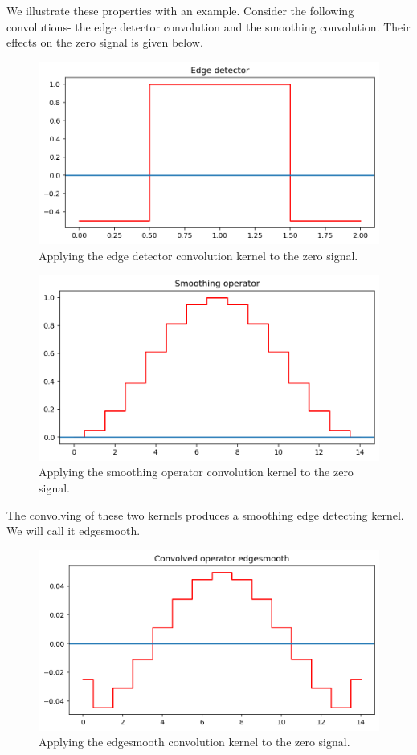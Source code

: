 \documentclass[a4paper, openany]{memoir}
\begin{document}
We illustrate these properties with an example. Consider the following convolutions- the edge detector convolution and the smoothing convolution. Their effects on the zero signal is given below.
\begin{figure}[H]
    \centering
    \includegraphics[scale=0.5]{src/6.14 edge detector.png}
    \caption{Applying the edge detector convolution kernel to the zero signal.}
\end{figure}
\begin{figure}[H]
    \centering
    \includegraphics[scale=0.5]{src/6.15 smoothing operator.png}
    \caption{Applying the smoothing operator convolution kernel to the zero signal.}
\end{figure}
\noindent The convolving of these two kernels produces a smoothing edge detecting kernel. We will call it edgesmooth.
\begin{figure}[H]
    \centering
    \includegraphics[scale=0.5]{src/6.16 edgesmooth.png}
    \caption{Applying the edgesmooth convolution kernel to the zero signal.}
\end{figure}
\end{document}
